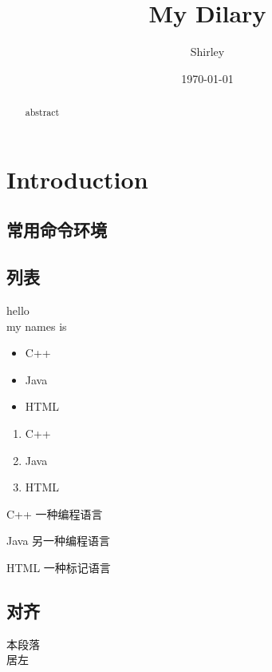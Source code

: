 \documentclass[a4paper,12pt,draft]{report} %
\begin{document}
\title{My Dilary} 
\author{Shirley} 
\date{\today} 
\maketitle

 \begin{abstract}
abstract
\end{abstract}
 
 \tableofcontents   %
 \chapter{Introduction}%
 
 \section{常用命令环境}
 \section{列表}
hello \\
my names is 

\begin{itemize}
	\item C++
	\item Java
	\item HTML
\end{itemize}

\begin{enumerate}
	\item C++
	\item Java
	\item HTML
\end{enumerate}

\begin{description} 
	\item{C++} 一种编程语言 
	\item{Java} 另一种编程语言 
	\item{HTML} 一种标记语言
\end{description}

 \section{对齐}
 \begin{flushleft} 
 本段落\\
居左 
 \end{flushleft}
 
\end{document}
